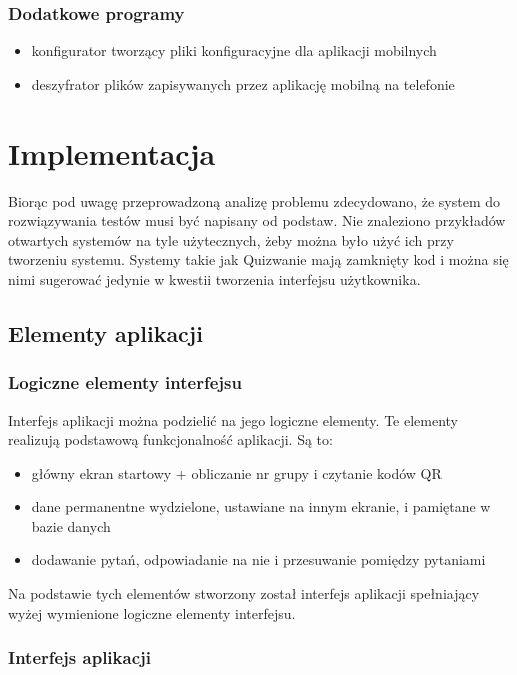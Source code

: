\documentclass[eng]{mgr}
\begin{document}
			\subsection{Dodatkowe programy}
			\begin{itemize}
				\item konfigurator tworzący pliki konfiguracyjne dla aplikacji mobilnych
				\item deszyfrator plików zapisywanych przez aplikację mobilną na telefonie
			\end{itemize}
	
	\chapter{Implementacja}
	
	Biorąc pod uwagę przeprowadzoną analizę problemu zdecydowano, że system do rozwiązywania testów musi być napisany od podstaw. Nie znaleziono przykładów otwartych systemów na tyle użytecznych, żeby można było użyć ich przy tworzeniu systemu. Systemy takie jak Quizwanie mają zamknięty kod i można się nimi sugerować jedynie w kwestii tworzenia interfejsu użytkownika.
	
		\section{Elementy aplikacji}
		
			\subsection{Logiczne elementy interfejsu}
			
			Interfejs aplikacji można podzielić na jego logiczne elementy. Te elementy realizują podstawową funkcjonalność aplikacji. Są to:
			\begin{itemize}
				\item główny ekran startowy + obliczanie nr grupy i czytanie kodów QR
				\item dane permanentne wydzielone, ustawiane na innym ekranie, i pamiętane w bazie danych
				\item dodawanie pytań, odpowiadanie na nie i przesuwanie pomiędzy pytaniami
			\end{itemize}
			Na podstawie tych elementów stworzony został interfejs aplikacji spełniający wyżej wymienione logiczne elementy interfejsu.
	
			\subsection{Interfejs aplikacji}
		
\end{document}
